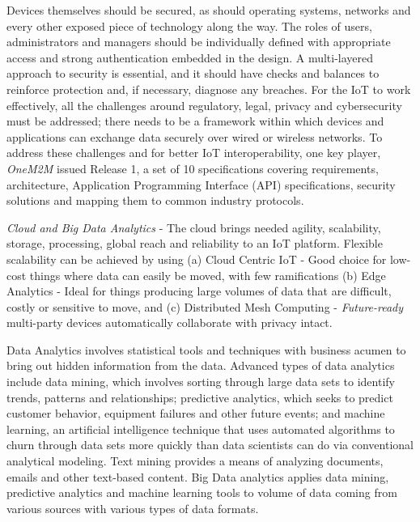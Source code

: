 \documentclass[sigconf]{acmart}
\begin{document}
Devices themselves should be secured, as should operating systems, networks and every other exposed piece of technology along the way. The roles of users, administrators and managers should be individually defined with appropriate access and strong authentication embedded in the design. A multi-layered approach to security is essential, and it should have checks and balances to reinforce protection and, if necessary, diagnose any breaches. For the IoT to work effectively, all the challenges around regulatory, legal, privacy and cybersecurity must be addressed; there needs to be a framework within which devices and applications can exchange data securely over wired or wireless networks. To address these challenges and for better IoT interoperability, one key player, {\em OneM2M} issued Release 1, a set of 10 specifications covering requirements, architecture, Application Programming Interface (API) specifications, security solutions and mapping them to common industry protocols\cite{6_OneM2M}.

{\em Cloud and Big Data Analytics} - The cloud brings needed agility, scalability, storage, processing, global reach and reliability to an IoT platform. Flexible scalability can be achieved by using (a) Cloud Centric IoT - Good choice for low-cost things where data can easily be moved, with few ramifications (b) Edge Analytics - Ideal for things producing large volumes of data that are difficult, costly or sensitive to move, and (c) Distributed Mesh Computing - {\em Future-ready} multi-party devices automatically collaborate with privacy intact. 

Data Analytics involves statistical tools and techniques with business acumen to bring out hidden information from the data. Advanced types of data analytics include data mining, which involves sorting through large data sets to identify trends, patterns and relationships; predictive analytics, which seeks to predict customer behavior, equipment failures and other future events; and machine learning, an artificial intelligence technique that uses automated algorithms to churn through data sets more quickly than data scientists can do via conventional analytical modeling. Text mining provides a means of analyzing documents, emails and other text-based content. Big Data analytics applies data mining, predictive analytics and machine learning tools to volume of data coming from various sources with various types of data formats. 
\end{document}
